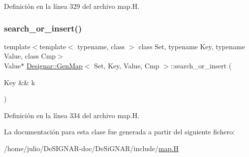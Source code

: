 Definición en la línea 329 del archivo map.\+H.

\mbox{\label{class_designar_1_1_gen_map_ae2ab69b26f782abcd99f99944253d8de}} 
\subsubsection{\texorpdfstring{search\+\_\+or\+\_\+insert()}{search\_or\_insert()}\hspace{0.1cm}{\footnotesize\ttfamily [6/6]}}
{\footnotesize\ttfamily template$<$template$<$ typename, class $>$ class Set, typename Key, typename Value, class Cmp$>$ \\
Value$\ast$ \hyperlink{class_designar_1_1_gen_map}{Designar\+::\+Gen\+Map}$<$ Set, Key, Value, Cmp $>$\+::search\+\_\+or\+\_\+insert (\begin{DoxyParamCaption}\item[{Key \&\&}]{k }\end{DoxyParamCaption})\hspace{0.3cm}{\ttfamily [inline]}}



Definición en la línea 334 del archivo map.\+H.



La documentación para esta clase fue generada a partir del siguiente fichero\+:\begin{DoxyCompactItemize}
\item 
/home/julio/\+De\+S\+I\+G\+N\+A\+R-\/doc/\+De\+Si\+G\+N\+A\+R/include/\hyperlink{map_8_h}{map.\+H}\end{DoxyCompactItemize}
